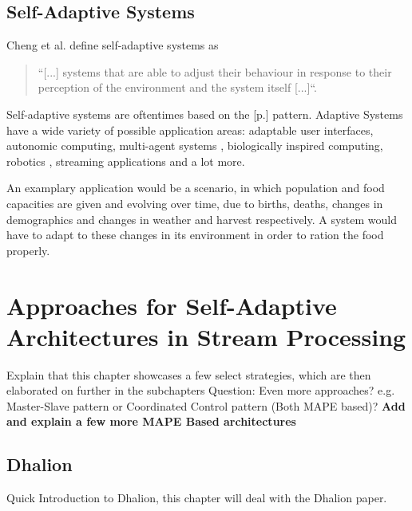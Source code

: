     
    \section{Self-Adaptive Systems}
    \label{sec:self-adaptive}
    Cheng et al. define self-adaptive systems as
    \begin{quotation}
        ``[...] systems that are able to adjust their behaviour in response to their perception of the environment and the
        system itself [...]``\cite[p.1]{Cheng:2009:SES:1573856.1573858}.
    \end{quotation}
    
    Self-adaptive systems are oftentimes based on the  [p.\pageref{sec:mape}] pattern.
    Adaptive Systems have a wide variety of possible application areas: adaptable user interfaces, autonomic computing, multi-agent systems \cite{Cheng:2009:SES:1573856.1573858}, 
    biologically inspired computing, robotics \cite{10.1007/978-3-319-59480-4_44}, streaming applications and a lot more.

    An examplary application would be a scenario, in which population and food capacities are given and evolving over time, due to births, deaths, changes in demographics 
    and changes in weather and harvest respectively. A system would have to adapt to these changes in its environment in order to ration the food properly.


\chapter{Approaches for Self-Adaptive Architectures in Stream Processing}
\label{cha:approaches}
Explain that this chapter showcases a few select strategies, which are then elaborated on further in the subchapters
Question: Even more approaches? e.g. Master-Slave pattern or Coordinated Control pattern (Both MAPE based)?
\textbf{Add and explain a few more MAPE Based architectures}

    \section{Dhalion}
    \label{sec:dhalion}
    Quick Introduction to Dhalion, this chapter will deal with the Dhalion paper.

